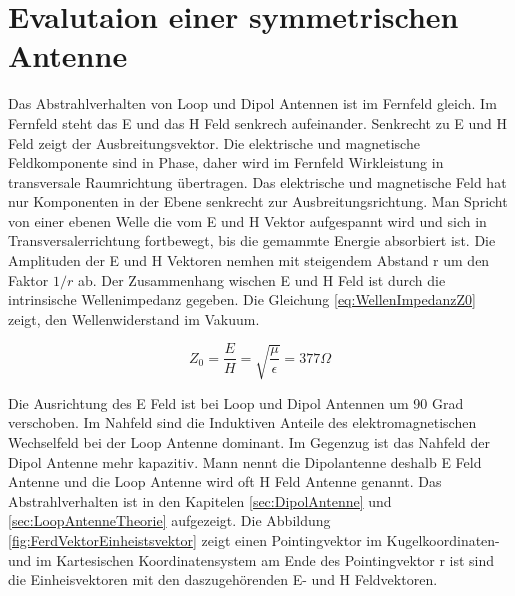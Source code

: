 \newpage
\section{Evalutaion einer symmetrischen Antenne}
Das Abstrahlverhalten von Loop und Dipol Antennen ist im Fernfeld gleich. Im Fernfeld steht das E und das H Feld senkrech aufeinander. Senkrecht zu E und H Feld zeigt der Ausbreitungsvektor. Die elektrische und magnetische Feldkomponente sind in Phase, daher wird im Fernfeld Wirkleistung in transversale Raumrichtung übertragen. Das elektrische und magnetische Feld hat nur Komponenten in der Ebene senkrecht zur Ausbreitungsrichtung. Man Spricht von einer ebenen Welle die vom E und H Vektor aufgespannt wird und sich in Transversalerrichtung fortbewegt, bis  die gemammte Energie absorbiert ist. Die Amplituden der E und H Vektoren nemhen mit steigendem Abstand r um den Faktor $1/r$ ab. Der Zusammenhang wischen E und H Feld ist durch die intrinsische Wellenimpedanz gegeben. Die Gleichung \ref{eq:WellenImpedanzZ0} zeigt, den Wellenwiderstand im Vakuum.

\begin{equation}\label{eq:WellenImpedanzZ0}
Z_{0}=\dfrac{E}{H}=\sqrt{\dfrac{\mu}{\epsilon}}=377\Omega
\end{equation}



Die Ausrichtung des E Feld ist bei Loop und Dipol Antennen um 90 Grad verschoben. 
Im Nahfeld sind die Induktiven Anteile des elektromagnetischen Wechselfeld bei der Loop Antenne dominant. 
Im Gegenzug ist das Nahfeld der Dipol Antenne mehr kapazitiv.
Mann nennt die Dipolantenne deshalb E Feld Antenne und die Loop Antenne wird oft H Feld Antenne genannt.
Das Abstrahlverhalten ist in den Kapitelen \ref{sec:DipolAntenne} und \ref{sec:LoopAntenneTheorie} aufgezeigt. Die Abbildung \ref{fig:FerdVektorEinheistsvektor} zeigt einen Pointingvektor im  Kugelkoordinaten- und im Kartesischen Koordinatensystem am Ende des Pointingvektor r ist sind die Einheisvektoren mit den daszugehörenden E- und H Feldvektoren.\\


